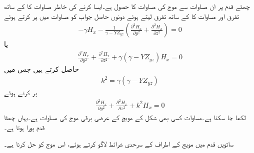 چھٹے قدم پر ان مساوات سے موج کی مساوات کا حصول ہے۔ایسا کرنے کی خاطر مساوات  کا  کے ساتھ تفرق اور مساوات  کا  کے ساتھ تفرق لیتے ہوئے دونوں حاصل جواب کو مساوات  میں پر کرتے ہوئے
\begin{align*}
-\gamma H_x-\frac{1}{\gamma -Y Z_{yz}} \left(\frac{\partial^2 H_x}{\partial y^2}+\frac{\partial^2 H_x}{\partial z^2} \right)=0
\end{align*}
یا
\begin{align*}
\frac{\partial^2 H_x}{\partial y^2}+\frac{\partial^2 H_x}{\partial z^2}+\gamma \left(\gamma-Y Z_{yz} \right)H_x =0
\end{align*}
حاصل کرتے ہیں جس میں
\begin{align}\label{مساوات_میوج_ڑ}
k^2=\gamma \left(\gamma-Y Z_{yz}\right)
\end{align}
پر کرتے ہوئے
\begin{align}\label{مساوات_میوج_ز}
\frac{\partial^2 H_x}{\partial y^2}+\frac{\partial^2 H_x}{\partial z^2}+k^2 H_x =0
\end{align}
لکھا جا سکتا ہے۔مساوات  کسی بھی شکل کے مویج کے عرضی برقی موج کی مساوات ہے۔یہاں چھٹا قدم پورا ہوتا ہے۔

ساتویں قدم میں مویج کے اطراف کے سرحدی شرائط لاگو کرتے ہوئے، اس موج کو حل کرنا ہے۔ 


